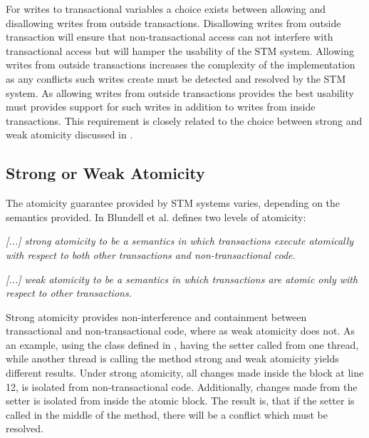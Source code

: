 For writes to transactional variables a choice exists between allowing and disallowing writes from outside transactions. Disallowing writes from outside transaction will ensure that non-transactional access can not interfere with transactional access but will hamper the usability of the \ac{STM} system. Allowing writes from outside transactions increases the complexity of the implementation as any conflicts such writes create must be detected and resolved by the \ac{STM} system. As allowing writes from outside transactions provides the best usability \stmnamesp must provides support for such writes in addition to writes from inside transactions. This requirement is closely related to the choice between strong and weak atomicity discussed in .

\subsection{Strong or Weak Atomicity}
\label{sec:design_strong_weak_atomicity}
The atomicity guarantee provided by \ac{STM} systems varies, depending on the semantics provided. In \cite{blundell2006subtleties} Blundell et al. defines two levels of atomicity:
%
\begin{defn}\label{def:strong_atomicity}
\emph{[...] strong atomicity to be a semantics in which transactions execute atomically
with respect to both other transactions and non-transactional code.}
\end{defn}
%
\begin{defn}\label{def:weak_atomicity}
\emph{[...] weak atomicity to be a semantics in which transactions are atomic only with respect to other transactions.}
\end{defn}

Strong atomicity provides non-interference and containment between transactional and non-transactional code, where as weak atomicity does not. As an example, using the  class defined in , having the  setter called from one thread, while another thread is calling the  method strong and weak atomicity yields different results. Under strong atomicity, all changes made inside the  block at line 12, is isolated from non-transactional code. Additionally, changes made from the setter is isolated from inside the atomic block. The result is, that if the setter is called in the middle of the  method, there will be a conflict which must be resolved. 

